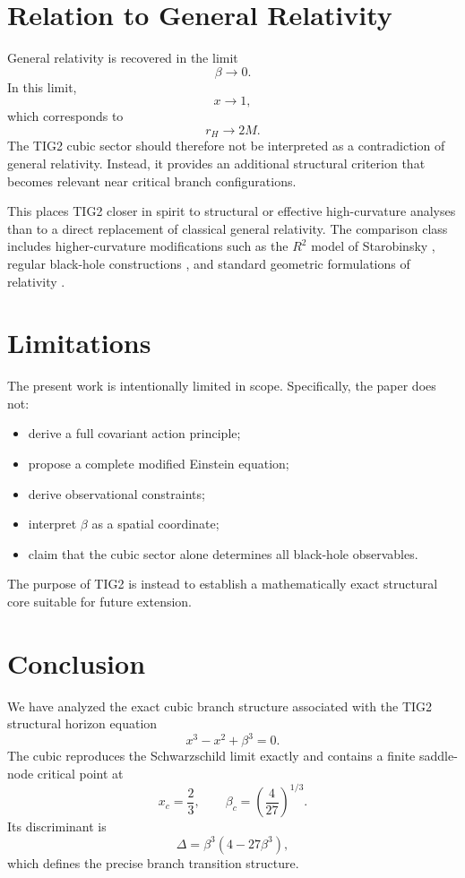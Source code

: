 \documentclass[12pt,a4paper]{article}
\begin{document}
\section{Relation to General Relativity}

General relativity is recovered in the limit
\[
\beta\to0.
\]
In this limit,
\[
x\to1,
\]
which corresponds to
\[
r_H\to2M.
\]
The TIG2 cubic sector should therefore not be interpreted as a contradiction of general relativity. Instead, it provides an additional structural criterion that becomes relevant near critical branch configurations.

This places TIG2 closer in spirit to structural or effective high-curvature analyses than to a direct replacement of classical general relativity. The comparison class includes higher-curvature modifications such as the \(R^2\) model of Starobinsky \cite{starobinsky1980}, regular black-hole constructions \cite{bardeen1968,dymnikova1992,hayward2006}, and standard geometric formulations of relativity \cite{wald1984,carroll2004}.

\section{Limitations}

The present work is intentionally limited in scope. Specifically, the paper does not:
\begin{itemize}
\item derive a full covariant action principle;
\item propose a complete modified Einstein equation;
\item derive observational constraints;
\item interpret \(\beta\) as a spatial coordinate;
\item claim that the cubic sector alone determines all black-hole observables.
\end{itemize}

The purpose of TIG2 is instead to establish a mathematically exact structural core suitable for future extension.

\section{Conclusion}

We have analyzed the exact cubic branch structure associated with the TIG2 structural horizon equation
\[
x^3-x^2+\beta^3=0.
\]
The cubic reproduces the Schwarzschild limit exactly and contains a finite saddle-node critical point at
\[
x_c=\frac{2}{3},
\qquad
\beta_c=\left(\frac{4}{27}\right)^{1/3}.
\]
Its discriminant is
\[
\Delta=\beta^3(4-27\beta^3),
\]
which defines the precise branch transition structure.
\end{document}
